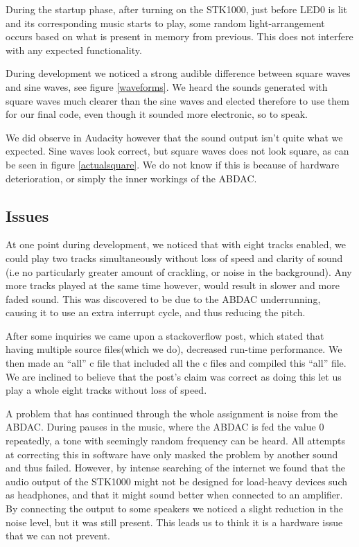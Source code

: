 \documentclass[a4paper,12pt]{article}
\begin{document}
During the startup phase, after turning on the STK1000, just before LED0 is lit and its corresponding music starts to play, some random light-arrangement occurs based on what is present in memory from previous. This does not interfere with any expected functionality.      

During development we noticed a strong audible difference between square waves and sine waves, see figure \ref{waveforms}. We heard the sounds generated with square waves much clearer than the sine waves and elected therefore to use them for our final code, even though it sounded more electronic, so to speak.

We did observe in Audacity however that the sound output isn’t quite what we expected. Sine waves look correct, but square waves does not look square, as can be seen in figure \ref{actualsquare}. We do not know if this is because of hardware deterioration, or simply the inner workings of the ABDAC.
\subsection{Issues}

At one point during development, we noticed that with eight tracks enabled, we could play two tracks simultaneously without loss of speed and clarity of sound (i.e no particularly greater amount of crackling, or noise in the background). Any more tracks played at the same time however, would result in slower and more faded sound. This was discovered to be due to the ABDAC underrunning, causing it to use an extra interrupt cycle, and thus reducing the pitch.

After some inquiries we came upon a stackoverflow post\cite{multifile}, which stated that having multiple source files(which we do), decreased run-time performance. We then made an “all” c file that included all the c files and compiled this “all” file. We are inclined to believe that the post’s claim was correct as doing this let us play a whole eight tracks without loss of speed.

A problem that has continued through the whole assignment is noise from the ABDAC. During pauses in the music, where the ABDAC is fed the value 0 repeatedly, a tone with seemingly random frequency can be heard. All attempts at correcting this in software have only masked the problem by another sound and thus failed. However, by intense searching of the internet we found that the audio output of the STK1000 might not be designed for load-heavy devices such as headphones, and that it might sound better when connected to an amplifier\cite{impedance}. By connecting the output to some speakers we noticed a slight reduction in the noise level, but it was still present. This leads us to think it is a hardware issue that we can not prevent. 
\end{document}
